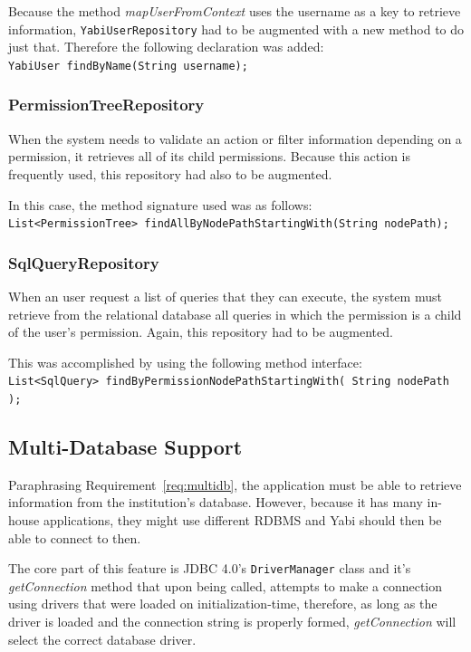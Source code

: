 Because the method \textit{mapUserFromContext} uses the username as a key to retrieve information, \texttt{YabiUserRepository} had to be augmented with a new method to do just that. Therefore the following declaration was added:\\
\texttt{YabiUser findByName(String username);}

\subsubsection{PermissionTreeRepository}
When the system needs to validate an action or filter information depending on a permission, it retrieves all of its child permissions. Because this action is frequently used, this repository had also to be augmented.

In this case, the method signature used was as follows:\\
\texttt{List<PermissionTree> findAllByNodePathStartingWith(String~nodePath);}

\subsubsection{SqlQueryRepository}
When an user request a list of queries that they can execute, the system must retrieve from the relational database all queries in which the permission is a child of the user's permission. Again, this repository had to be augmented.

This was accomplished by using the following method interface:\\
\texttt{List<SqlQuery> findByPermissionNodePathStartingWith( String~nodePath );}

\subsection{Multi-Database Support}\label{s:mdbs}
Paraphrasing Requirement~\ref{req:multidb}, the application must be able to retrieve information from the institution's database. However, because it has many in-house applications, they might use different \gls{RDBMS} and \gls{Yabi} should then be able to connect to then.

The core part of this feature is \gls{JDBC} 4.0's \texttt{DriverManager} class and it's \textit{getConnection} method that upon being called, attempts to make a connection using drivers that were loaded on initialization-time, therefore, as long as the driver is loaded and the connection string is properly formed, \textit{getConnection} will select the correct database driver.

